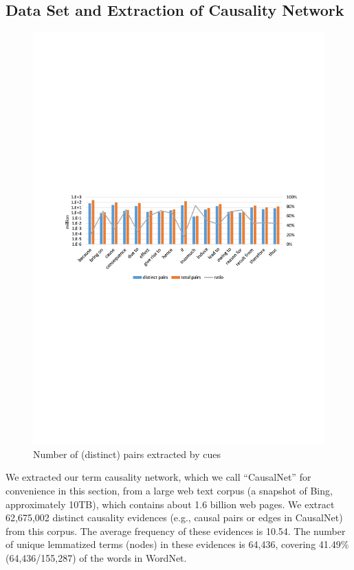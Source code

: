 \documentclass[letterpaper]{article}
\begin{document}
\subsection{Data Set and Extraction of Causality Network}
\label{sec:causalnet}
\begin{figure}[th]
\centering
\includegraphics[width=1.6\columnwidth]{pattern1}
\caption{Number of (distinct) pairs extracted by cues}
\label{fig:pattern1}
\end{figure}
We extracted our term causality network, which we call ``CausalNet''
for convenience in this section, from a large web text corpus (a snapshot of Bing, approximately 10TB), %
which contains about 1.6 billion web pages.
We extract 62,675,002 distinct causality evidences (e.g., causal pairs
or edges in CausalNet) from this corpus.
The average frequency of these evidences is 10.54.
The number of unique lemmatized terms (nodes)
in these evidences is 64,436, covering 41.49\% (64,436/155,287) of the
words in WordNet.
\end{document}

